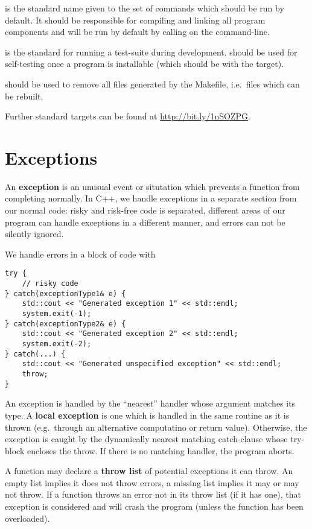\documentclass[12pt]{article}
\begin{document}
 is the standard name given to the set of commands which should be run by default. It should be responsible for compiling and linking all program components and will be run by default by calling  on the command-line.

 is the standard for running a test-suite during development.  should be used for self-testing once a program is installable (which should be with the  target).

 should be used to remove all files generated by the Makefile, i.e.\ files which can be rebuilt.

Further standard targets can be found at \url{http://bit.ly/1nSOZPG}.

\section{Exceptions}
An {\bf exception} is an unusual event or situtation which prevents a function from completing normally. In C++, we handle exceptions in a separate section from our normal code: risky and risk-free code is separated, different areas of our program can handle exceptions in a different manner, and errors can not be silently ignored.

We handle errors in a block of code with
\begin{verbatim}
try {
    // risky code
} catch(exceptionType1& e) {
    std::cout << "Generated exception 1" << std::endl;
    system.exit(-1);
} catch(exceptionType2& e) {
    std::cout << "Generated exception 2" << std::endl;
    system.exit(-2);
} catch(...) {
    std::cout << "Generated unspecified exception" << std::endl;
    throw;
}
\end{verbatim}

An exception is handled by the ``nearest'' handler whose argument matches its type. A {\bf local exception} is one which is handled in the same routine as it is thrown (e.g.\ through an alternative computatino or return value). Otherwise, the exception is caught by the dynamically nearest matching catch-clause whose try-block encloses the throw. If there is no matching handler, the program aborts.

A function may declare a {\bf throw list} of potential exceptions it can throw. An empty list implies it does not throw errors, a missing list implies it may or may not throw. If a function throws an error not in its throw list (if it has one), that exception is considered  and will crash the program (unless the  function has been overloaded).
\end{document}
